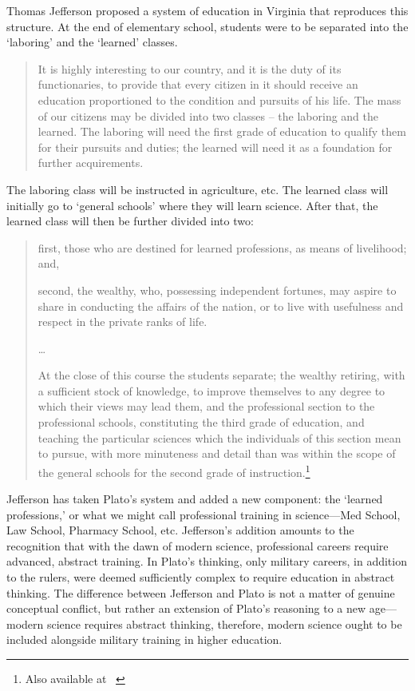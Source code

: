 Thomas Jefferson proposed a system of education in Virginia that reproduces this structure. At the end of elementary school, students were to be separated into the `laboring' and the `learned' classes.

\begin{quote}

It is highly interesting to our country, and it is the duty of its functionaries, to provide that every citizen in it should receive an education proportioned to the condition and pursuits of his life. The mass of our citizens may be divided into two classes -- the laboring and the learned. The laboring will need the first grade of education to qualify them for their pursuits and duties; the learned will need it as a foundation for further acquirements. ~\citep[p. 350--351]{Jefferson:1976vz}
\end{quote}

The laboring class will be instructed in agriculture, etc. The learned class will initially go to `general schools' where they will learn science. After that, the learned class will then be further divided into two:

\begin{quote}

first, those who are destined for learned professions, as means of livelihood; and, 

second, the wealthy, who, possessing independent fortunes, may aspire to share in conducting the affairs of the nation, or to live with usefulness and respect in the private ranks of life. 

{\ldots}

At the close of this course the students separate; the wealthy retiring, with a sufficient stock of knowledge, to improve themselves to any degree to which their views may lead them, and the professional section to the professional schools, constituting the third grade of education, and teaching the particular sciences which the individuals of this section mean to pursue, with more minuteness and detail than was within the scope of the general schools for the second grade of instruction.\footnote{Also available at ~\citep{Jefferson:s6FdWc7-}} ~\citep[p. 351--352]{Jefferson:1976vz}
\end{quote}

Jefferson has taken Plato's system and added a new component: the `learned professions,' or what we might call professional training in science---Med School, Law School, Pharmacy School, etc. Jefferson's addition amounts to the recognition that with the dawn of modern science, professional careers require advanced, abstract training. In Plato's thinking, only military careers, in addition to the rulers, were deemed sufficiently complex to require education in abstract thinking. The difference between Jefferson and Plato is not a matter of genuine conceptual conflict, but rather an extension of Plato's reasoning to a new age---modern science requires abstract thinking, therefore, modern science ought to be included alongside military training in higher education.

